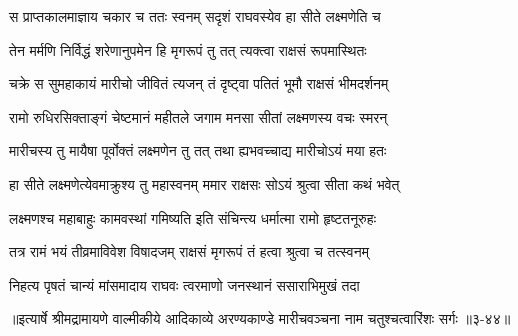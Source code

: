 \twolineshloka
{स प्राप्तकालमाज्ञाय चकार च ततः स्वनम्}
{सदृशं राघवस्येव हा सीते लक्ष्मणेति च} %

\twolineshloka
{तेन मर्मणि निर्विद्धं शरेणानुपमेन हि}
{मृगरूपं तु तत् त्यक्त्वा राक्षसं रूपमास्थितः} %

\twolineshloka
{चक्रे स सुमहाकायं मारीचो जीवितं त्यजन्}
{तं दृष्ट्वा पतितं भूमौ राक्षसं भीमदर्शनम्} %

\twolineshloka
{रामो रुधिरसिक्ताङ्गं चेष्टमानं महीतले}
{जगाम मनसा सीतां लक्ष्मणस्य वचः स्मरन्} %

\twolineshloka
{मारीचस्य तु मायैषा पूर्वोक्तं लक्ष्मणेन तु}
{तत् तथा ह्यभवच्चाद्य मारीचोऽयं मया हतः} %

\twolineshloka
{हा सीते लक्ष्मणेत्येवमाक्रुश्य तु महास्वनम्}
{ममार राक्षसः सोऽयं श्रुत्वा सीता कथं भवेत्} %

\twolineshloka
{लक्ष्मणश्च महाबाहुः कामवस्थां गमिष्यति}
{इति संचिन्त्य धर्मात्मा रामो हृष्टतनूरुहः} %

\twolineshloka
{तत्र रामं भयं तीव्रमाविवेश विषादजम्}
{राक्षसं मृगरूपं तं हत्वा श्रुत्वा च तत्स्वनम्} %

\twolineshloka
{निहत्य पृषतं चान्यं मांसमादाय राघवः}
{त्वरमाणो जनस्थानं ससाराभिमुखं तदा} %


॥इत्यार्षे श्रीमद्रामायणे वाल्मीकीये आदिकाव्ये अरण्यकाण्डे मारीचवञ्चना नाम चतुश्चत्वारिंशः सर्गः ॥३-४४॥
